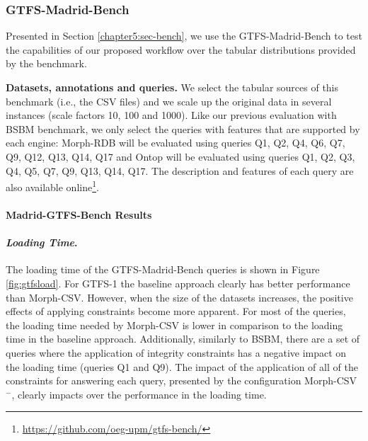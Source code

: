 \subsubsection{GTFS-Madrid-Bench}
Presented in Section \ref{chapter5:sec-bench}, we use the GTFS-Madrid-Bench to test the capabilities of our proposed workflow over the tabular distributions provided by the benchmark.

\noindent\textbf{Datasets, annotations and queries.} We select the tabular sources of this benchmark (i.e., the CSV files) and we scale up the original data in several instances (scale factors 10, 100 and 1000). Like our previous evaluation with BSBM benchmark, we only select the queries with features that are supported by each engine: Morph-RDB will be evaluated using  queries Q1, Q2, Q4, Q6, Q7, Q9, Q12, Q13, Q14, Q17 and Ontop will be evaluated using  queries Q1, Q2, Q3, Q4, Q5, Q7, Q9, Q13, Q14, Q17. The description and features of each query are also available online\footnote{\url{https://github.com/oeg-upm/gtfs-bench/}}.

\noindent\paragraph*{\textbf{Madrid-GTFS-Bench Results}}

\noindent\paragraph*{\textit{Loading Time}.}
The loading time of the GTFS-Madrid-Bench queries is shown in Figure \ref{fig:gtfsload}. For GTFS-1 the baseline approach clearly has better performance than Morph-CSV. However, when the size of the datasets increases, the positive effects of applying constraints become more apparent. For most of the queries, the loading time needed by Morph-CSV is lower in comparison to the loading time in the baseline approach. Additionally, similarly to BSBM, there are a set of queries where the application of integrity constraints has a negative impact on the loading time (queries Q1 and Q9). The impact of the application of all of the constraints for answering each query, presented by the configuration Morph-CSV$^-$, clearly impacts over the performance in the loading time.

